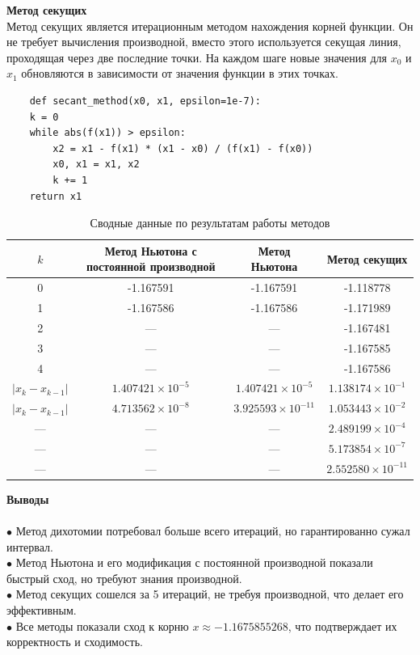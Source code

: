 \documentclass[a4paper, 12pt]{report}
\begin{document}
\textbf{Метод секущих}\\
Метод секущих является итерационным методом нахождения корней функции. Он не требует вычисления производной, вместо этого используется секущая линия, проходящая через две последние точки. На каждом шаге новые значения для \(x_0\) и \(x_1\) обновляются в зависимости от значения функции в этих точках.
\begin{verbatim}
    def secant_method(x0, x1, epsilon=1e-7):
    k = 0
    while abs(f(x1)) > epsilon:
        x2 = x1 - f(x1) * (x1 - x0) / (f(x1) - f(x0))
        x0, x1 = x1, x2
        k += 1
    return x1
\end{verbatim}


\begin{table}[h]
    \centering
    \small
    \begin{tabular}{|c|c|c|c|}
        \hline
        $k$ & Метод Ньютона с постоянной производной & Метод Ньютона & Метод секущих \\
        \hline
        0 & -1.167591 & -1.167591 & -1.118778 \\
        \hline
        1 & -1.167586 & -1.167586 & -1.171989 \\
        \hline
        2 & — & — & -1.167481 \\
        \hline
        3 & — & — & -1.167585 \\
        \hline
        4 & — & — & -1.167586 \\
        \hline
        \hline
        $|x_k - x_{k-1}|$ & $1.407421 \times 10^{-5}$ & $1.407421 \times 10^{-5}$ & $1.138174 \times 10^{-1}$ \\
        \hline
        $|x_k - x_{k-1}|$ & $4.713562 \times 10^{-8}$ & $3.925593 \times 10^{-11}$ & $1.053443 \times 10^{-2}$ \\
        \hline
        — & — & — & $2.489199 \times 10^{-4}$ \\
        \hline
        — & — & — & $5.173854 \times 10^{-7}$ \\
        \hline
        — & — & — & $2.552580 \times 10^{-11}$ \\
        \hline
    \end{tabular}
    \caption{Сводные данные по результатам работы методов}
\end{table}


\newpage
\textbf{\Huge{Выводы}}\\\\
$\bullet$ Метод дихотомии потребовал больше всего итераций, но гарантированно сужал интервал.\\
$\bullet$ Метод Ньютона и его модификация с постоянной производной показали быстрый сход, но требуют знания производной.\\
$\bullet$ Метод секущих сошелся за 5 итераций, не требуя производной, что делает его эффективным.\\
$\bullet$ Все методы показали сход к корню $x \approx -1.1675855268$, что подтверждает их корректность и сходимость.
\end{document}
